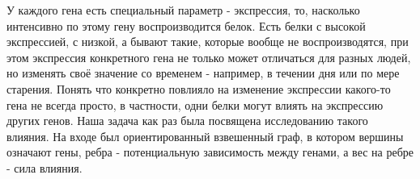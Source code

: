 \documentclass[a4paper, 14pt]{article}
\title{}
\date{\today}
\author{Oleg Vasilev}
\theoremstyle{definition}
\theoremstyle{plain}
\theoremstyle{remark}
\begin{document}
\maketitle
У каждого гена есть специальный параметр - экспрессия, то, насколько интенсивно по этому гену воспроизводится белок. Есть белки с высокой экспрессией, с низкой, а бывают такие, которые вообще не воспроизводятся, при этом экспрессия конкретного гена не только может отличаться для разных людей, но изменять своё значение со временем - например, в течении дня или по мере старения. Понять что конкретно повлияло на изменение экспрессии какого-то гена не всегда просто, в частности, одни белки могут влиять на экспрессию других генов. Наша задача как раз была посвящена исследованию такого влияния. 
На входе был ориентированный взвешенный граф, в котором вершины означают гены, ребра - потенциальную зависимость между генами, а вес на ребре - сила влияния. 
\end{document}
